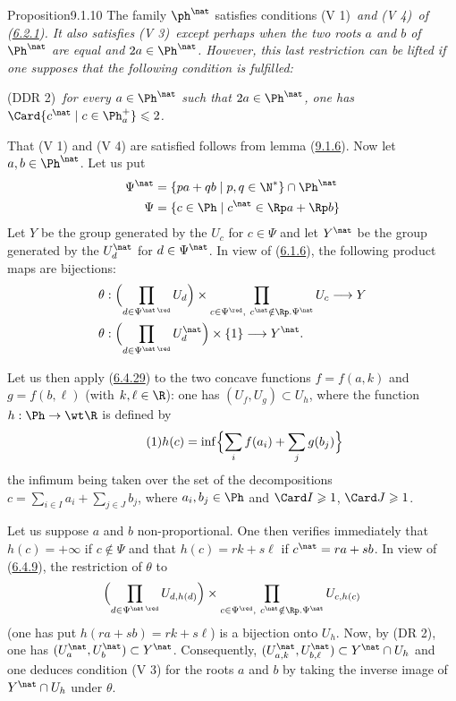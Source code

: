 \documentclass[12pt,a4paper,oneside,english]{smfart}
\makeatletter
\newcommand{\btanchor}[1]{\leavevmode\Hy@raisedlink{\hypertarget{bt:#1}{}}}
\newcommand{\btpageanchor}[1]{\Hy@raisedlink{\hypertarget{p:#1}{}}}
\newcommand{\btref}[1]{\hyperlink{bt:#1}{#1}}
\newcommand{\btpage}[1]{\marginnote{p.~#1}\btpageanchor{#1}}
\newcommand{\pg}[1]{\btpage{#1}}
\theoremstyle{definition}
\theoremstyle{bt}
\makeatother
\begin{document}
\begin{stmt}{Proposition}{9.1.10}\btanchor{9.1.10}
The family $\ph^\nat$ satisfies conditions \upshape(V 1)\itshape\ and
\upshape(V 4)\itshape\ of (\btref{6.2.1}). It also satisfies \upshape(V 3)\itshape\ except
perhaps when the two roots $a$ and $b$ of $\Ph^\nat$ are equal and $2a\in\Ph^\nat$.
However, this last restriction can be lifted if one supposes that the following
condition is fulfilled:

\upshape(DDR 2)\itshape\ for every $a\in\Ph^\nat$ such that $2a\in\Ph^\nat$, one has
$\Card\{c^\nat\mid c\in\Ph^+_a\}\leqslant2$.
\end{stmt}

That (V 1) and (V 4) are satisfied follows from lemma (\btref{9.1.6}). Now let
$a,b\in\Ph^\nat$. Let us put
\begin{align*}
\Psi^\nat&=\{pa+qb\mid p,q\in\N^*\}\cap\Ph^\nat\\
\Psi&=\{c\in\Ph\mid c^\nat\in\Rp a+\Rp b\}
\end{align*}
\pg{199}
Let $Y$ be the group generated by the $U_c$ for $c\in\Psi$ and let $Y^\nat$ be the group
generated by the $U^\nat_d$ for $d\in\Psi^\nat$. In view of (\btref{6.1.6}), the following
product maps are bijections:
\begin{align*}
\theta&:\Bigl(\prod_{d\in\Psi^{\nat\,\red}}U_d\Bigr)\times
\prod_{c\in\Psi^{\red},\ c^\nat\notin\Rp.\Psi^\nat}U_c\longrightarrow Y\\
\theta&:\Bigl(\prod_{d\in\Psi^{\nat\,\red}}U^\nat_d\Bigr)\times\{1\}\longrightarrow
Y^\nat .
\end{align*}

Let us then apply (\btref{6.4.29}) to the two concave functions $f=f(a,k)$ and $g=f(b,\ell)$
(with $k,\ell\in\R$): one has $(U_f,U_g)\subset U_h$, where the function
$h:\Ph\to\wt\R$ is defined by
\begin{equation}\tag{1}
h(c)=\inf\Bigl\{\sum_i f(a_i)+\sum_j g(b_j)\Bigr\}
\end{equation}
the infimum being taken over the set of the decompositions
$c=\sum_{i\in I}a_i+\sum_{j\in J}b_j$, where $a_i,b_j\in\Ph$ and $\Card I\geqslant1$,
$\Card J\geqslant1$.

Let us suppose $a$ and $b$ non-proportional. One then verifies immediately that
$h(c)=+\infty$ if $c\notin\Psi$ and that $h(c)=rk+s\ell$ if $c^\nat=ra+sb$. In view of
(\btref{6.4.9}), the restriction of $\theta$ to
\[
\Bigl(\prod_{d\in\Psi^{\nat\,\red}}U_{d,h(d)}\Bigr)\times
\prod_{c\in\Psi^{\red},\ c^\nat\notin\Rp.\Psi^\nat}U_{c,h(c)}
\]
(one has put $h(ra+sb)=rk+s\ell$) is a bijection onto $U_h$. Now, by (DR 2), one has
$(U^\nat_a,U^\nat_b)\subset Y^\nat$. Consequently,
$(U^\nat_{a,k},U^\nat_{b,\ell})\subset Y^\nat\cap U_h$ and one deduces condition (V 3)
for the roots $a$ and $b$ by taking the inverse image of $Y^\nat\cap U_h$ under
$\theta$.
\end{document}
